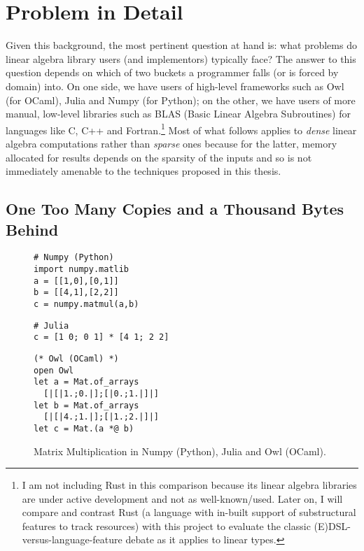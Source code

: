 \section{Problem in Detail}

Given this background, the most pertinent question at hand is: what problems do
linear algebra library users (and implementors) typically face? The answer to
this question depends on which of two buckets a programmer falls (or is forced
by domain) into. On one side, we have users of high-level frameworks such as
Owl (for OCaml), Julia and Numpy (for Python); on the other, we have users
of more manual, low-level libraries such as BLAS (Basic Linear Algebra
Subroutines) for languages like C, C++ and Fortran.\footnote{I am not including
Rust in this comparison because its linear algebra libraries are under
active development and not as well-known/used. Later on, I will compare and
contrast Rust (a language with in-built support of substructural features
to track resources) with this project to evaluate the classic
(E)DSL-versus-language-feature debate as it applies to linear types.} Most of
what follows applies to \emph{dense} linear algebra computations rather than
\emph{sparse} ones because for the latter, memory allocated for results depends
on the sparsity of the inputs and so is not immediately amenable to the
techniques proposed in this thesis.

\subsection{One Too Many Copies and a Thousand Bytes Behind}
\begin{figure}[tbp]
    \centering
    \begin{minipage}{0.45\textwidth}
    \centering
    \begin{verbatim}
# Numpy (Python)
import numpy.matlib
a = [[1,0],[0,1]]
b = [[4,1],[2,2]]
c = numpy.matmul(a,b)
    \end{verbatim}
    \begin{verbatim}
# Julia
c = [1 0; 0 1] * [4 1; 2 2]
    \end{verbatim}
    \end{minipage}%
    \begin{minipage}{0.45\textwidth}
    \centering
    \begin{verbatim}
(* Owl (OCaml) *)
open Owl
let a = Mat.of_arrays
  [|[|1.;0.|];[|0.;1.|]|]
let b = Mat.of_arrays
  [|[|4.;1.|];[|1.;2.|]|]
let c = Mat.(a *@ b)
    \end{verbatim}
    \end{minipage}
    \caption{Matrix Multiplication in Numpy (Python), Julia and Owl (OCaml).}\label{fig:mat_mul_copies}
\end{figure}


